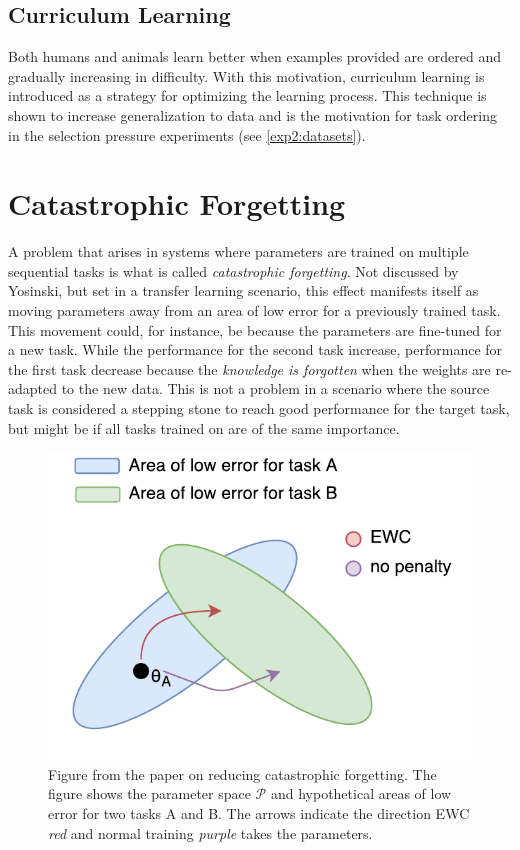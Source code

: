 \subsection{Curriculum Learning}
Both humans and animals learn better when examples provided are ordered and gradually increasing in difficulty. With this motivation, curriculum learning is introduced as a strategy for optimizing the learning process. This technique is shown to increase generalization to data\cite{curriculumlearning} and is the motivation for task ordering in the selection pressure experiments (see \ref{exp2:datasets}).

\section{Catastrophic Forgetting}
\label{background:catastrophicforgetting}
A problem that arises in systems where parameters are trained on multiple sequential tasks is what is called \textit{catastrophic forgetting}. Not discussed by Yosinski, but set in a transfer learning scenario, this effect manifests itself as moving parameters away from an area of low error for a previously trained task. This movement could, for instance, be because the parameters are fine-tuned for a new task. While the performance for the second task increase, performance for the first task decrease because the \textit{knowledge is forgotten} when the weights are re-adapted to the new data. This is not a problem in a scenario where the source task is considered a stepping stone to reach good performance for the target task, but might be if all tasks trained on are of the same importance.

\begin{figure}[h]
    \centering
    \includegraphics[width=0.7\linewidth]{Chapters/2.Background/figures/EWC.pdf}
    \caption[Elastic Weight Consolidation]{Figure from the paper on reducing catastrophic forgetting\cite{ewc}. The figure shows the parameter space \(\mathcal{P}\) and hypothetical areas of low error for two tasks A and B. The arrows indicate the direction EWC \textit{red} and normal training \textit{purple} takes the parameters.}
    \label{fig:ewc}
\end{figure}

